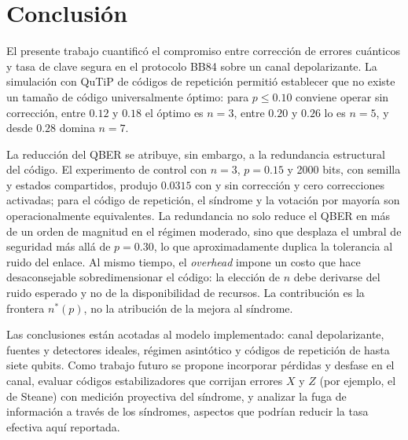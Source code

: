 \documentclass[conference]{IEEEtran}
\begin{document}
\section{Conclusión}
\label{sec:conclusion}

El presente trabajo cuantificó el compromiso entre corrección de errores
cuánticos y tasa de clave segura en el protocolo BB84 sobre un canal
depolarizante. La simulación con QuTiP de códigos de repetición permitió
establecer que no existe un tamaño de código universalmente óptimo: para
$p \leq 0.10$ conviene operar sin corrección, entre $0.12$ y $0.18$ el óptimo es
$n=3$, entre $0.20$ y $0.26$ lo es $n=5$, y desde $0.28$ domina $n=7$.

La reducción del QBER se atribuye, sin embargo, a la redundancia estructural del
código. El experimento de control con \(n=3\), \(p=0.15\) y 2000 bits, con semilla
y estados compartidos, produjo \(0.0315\) con y sin corrección y cero correcciones
activadas; para el código de repetición, el síndrome y la votación por mayoría son
operacionalmente equivalentes. La redundancia no solo reduce el QBER en más de un
orden de magnitud en el régimen moderado, sino que desplaza el umbral de
seguridad más allá de $p=0.30$, lo que aproximadamente duplica la tolerancia al
ruido del enlace. Al mismo tiempo, el \textit{overhead} impone un costo que hace
desaconsejable sobredimensionar el código: la elección de $n$ debe derivarse del
ruido esperado y no de la disponibilidad de recursos. La contribución es la
frontera \(n^{*}(p)\), no la atribución de la mejora al síndrome.

Las conclusiones están acotadas al modelo implementado: canal depolarizante,
fuentes y detectores ideales, régimen asintótico y códigos de repetición de hasta
siete qubits. Como trabajo futuro se propone incorporar pérdidas y desfase en el
canal, evaluar códigos estabilizadores que corrijan errores \(X\) y \(Z\) (por
ejemplo, el de Steane) con medición proyectiva del síndrome, y analizar la fuga
de información a través de los síndromes, aspectos que podrían reducir la tasa
efectiva aquí reportada.
\end{document}

